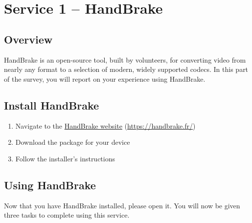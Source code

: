 \section{Service 1 – HandBrake}
\subsection{Overview}
HandBrake is an open-source tool, built by volunteers, for converting video from nearly any format to a selection of modern, widely supported codecs. In this part of the survey, you will report on your experience using HandBrake.

\subsection{Install HandBrake}

\begin{enumerate}
    \item Navigate to the \href{https://handbrake.fr/}{HandBrake website} (\url{https://handbrake.fr/})
    \item Download the package for your device
    \item Follow the installer's instructions
\end{enumerate}

\clearpage


\subsection{Using HandBrake}

Now that you have HandBrake installed, please open it. You will now be given three tasks to complete using this service.
\clearpage

\clearpage

\clearpage

\clearpage
